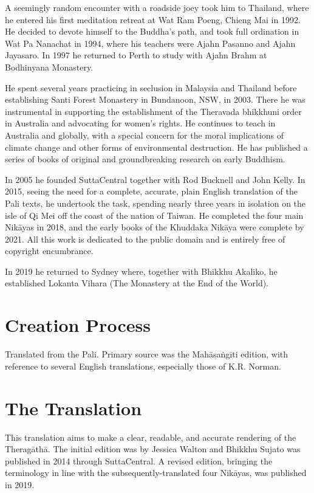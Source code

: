 \documentclass[12pt,openany]{book}%
\begin{document}
A seemingly random encounter with a roadside joey took him to Thailand, where he entered his first meditation retreat at Wat Ram Poeng, Chieng Mai in 1992. He decided to devote himself to the Buddha’s path, and took full ordination in Wat Pa Nanachat in 1994, where his teachers were Ajahn Pasanno and Ajahn Jayasaro. In 1997 he returned to Perth to study with Ajahn Brahm at Bodhinyana Monastery. 

He spent several years practicing in seclusion in Malaysia and Thailand before establishing Santi Forest Monastery in Bundanoon, NSW, in 2003. There he was instrumental in supporting the establishment of the Theravada bhikkhuni order in Australia and advocating for women’s rights. He continues to teach in Australia and globally, with a special concern for the moral implications of climate change and other forms of environmental destruction. He has published a series of books of original and groundbreaking research on early Buddhism. 

In 2005 he founded SuttaCentral together with Rod Bucknell and John Kelly. In 2015, seeing the need for a complete, accurate, plain English translation of the Pali texts, he undertook the task, spending nearly three years in isolation on the isle of Qi Mei off the coast of the nation of Taiwan. He completed the four main \textsanskrit{Nikāyas} in 2018, and the early books of the Khuddaka \textsanskrit{Nikāya} were complete by 2021. All this work is dedicated to the public domain and is entirely free of copyright encumbrance. 

In 2019 he returned to Sydney where, together with Bhikkhu Akaliko, he established Lokanta Vihara (The Monastery at the End of the World). 

\section*{Creation Process}

Translated from the Pali. Primary source was the \textsanskrit{Mahāsaṅgīti} edition, with reference to several English translations, especially those of K.R. Norman.

\section*{The Translation}

This translation aims to make a clear, readable, and accurate rendering of the \textsanskrit{Theragāthā}. The initial edition was by Jessica Walton and Bhikkhu Sujato was published in 2014 through SuttaCentral. A revised edition, bringing the terminology in line with the subsequently-translated four \textsanskrit{Nikāyas}, was published in 2019.
\end{document}
